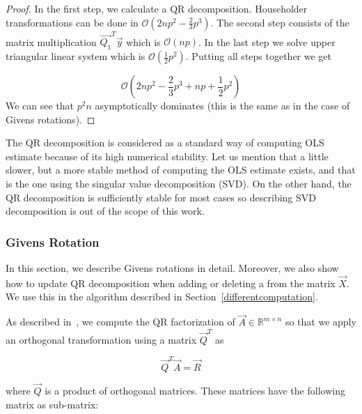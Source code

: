 \begin{proof}
    In the first step, we calculate a QR decomposition. Householder transformations can be done in $\mathcal{O}(2np^2 - \frac{2}{3}p^3)$.
    The second step consists of the matrix multiplication $\vec{Q_1}^T \vec{y}$ which is $\mathcal{O}(np)$.  In the last step we solve upper triangular linear system which is $\mathcal{O}(\frac{1}{2}p^2)$.
    Putting all steps together we get  

    \begin{equation} \label{time:complexity:ols:qr:householder}
        \mathcal{O}(2np^2 - \frac{2}{3}p^3 + np + \frac{1}{2}p^2)
    \end{equation}
    We can see that $p^2n$ asymptotically dominates (this is the same as in the case of Givens rotations).
\end{proof}

The QR decomposition is considered as a standard way of computing OLS estimate because of its high numerical stability. Let us mention that a little slower, but a more stable method of computing the OLS estimate exists, and that is the one using the singular value decomposition (SVD). On the other hand, the QR decomposition is sufficiently stable for most cases so describing SVD decomposition is out of the scope of this work. 



\subsubsection*{Givens Rotation} \label{givensrotation}
In this section, we describe Givens rotations in detail. Moreover, we also show how to update QR decomposition when adding or deleting a from the matrix $\vec{X}$. We use this in the algorithm described in Section~\ref{differentcomputation}.

As described in~\cite{hammarling2008updatingqr}, we compute the QR factorization of $\vec{A} \in \mathbb{R}^{m \times n}$ so that we apply an orthogonal transformation using a matrix $\vec{Q}^T$ as 

\begin{equation}
    \vec{Q}^T\vec{A} = \vec{R}
\end{equation}
 
where $\vec{Q}$ is a product of orthogonal matrices. These matrices have the following matrix as sub-matrix:

